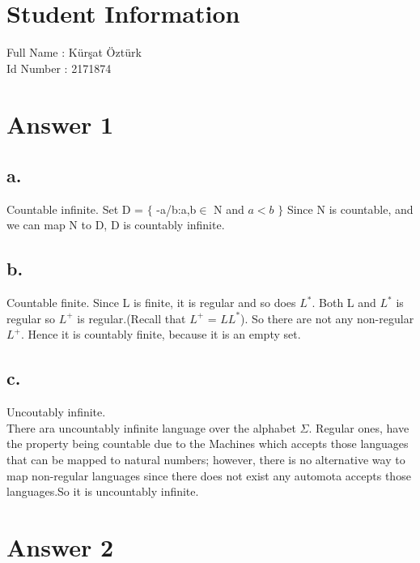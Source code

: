 \documentclass[12pt]{article}
\begin{document}
\section*{Student Information } 
Full Name : Kürşat Öztürk \\
Id Number :  2171874 \\

\section*{Answer 1}

\subsection*{a.}
Countable infinite. Set D = $\{$ -a/b:a,b$\in$ N and $a< b$ $\}$ Since N is countable, and we can map N to D, D is countably infinite.
\subsection*{b.}
Countable finite. Since L is finite, it is regular and so does $L^*$. Both L and $L^*$ is regular so $L^+$ is regular.(Recall that $L^+$ = $LL^*$).
So there are not any non-regular $L^+$.
Hence it is countably finite, because it is an empty set.
\subsection*{c.}
Uncoutably infinite.\\
There ara uncountably infinite language over the alphabet $\Sigma$. Regular ones, have the property being countable due to the Machines which accepts those languages that can be mapped to natural numbers; however, there is no alternative way to map non-regular languages since there does not exist any automota accepts those languages.So it is uncountably infinite.\\

\section*{Answer 2}
\end{document}
